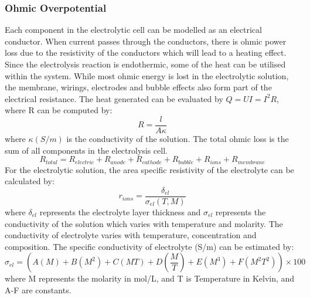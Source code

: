 \subsubsection{Ohmic Overpotential} 
Each component in the electrolytic cell can be modelled as an electrical conductor. When current passes through the conductors, there is ohmic power loss due to the resistivity of the conductors which will lead to a heating effect. Since the electrolysis reaction is endothermic, some of the heat can be utilised within the system. While most ohmic energy is lost in the electrolytic solution, the membrane, wirings, electrodes  and bubble effects also form part of the electrical resistance. The heat generated can be evaluated by  $ Q=UI=I^2 R$, where R can be computed by:
 \begin{equation}
R=\frac{l} {A \kappa} 
\end{equation} 
where $ \kappa(S/m) $  is the conductivity of the solution.\newline
The total ohmic loss is the sum of all components in the electrolysis cell.
\begin{equation} 
R_{total}=R_{electric} + R_{anode}+ R_{cathode}+R_{bubble}+R_{ions} +R_{membrane} 
\end{equation} 
For the electrolytic solution, the area specific resistivity of the electrolyte can be calculated by:\cite{conductivity}
\begin{equation} 
r_{ions}=\frac{\delta_{el}} {\sigma_{el}(T,M) } 
\end{equation} 
where $\delta_{el}$ represents the electrolyte layer thickness and $\sigma_{el}$ represents the conductivity of the solution which varies with temperature and molarity.
The conductivity of electrolyte varies with temperature, concentration and composition. The specific conductivity of electrolyte (S/m) can be estimated by:\cite{conductivity}
\begin{equation} 
\sigma_{el} = (A(M) + B(M^2) + C(MT) + D(\frac{M} {T}) + E(M^3) +F(M^2T^2) )\times 100
\label{eq:sig}
\end{equation} 
where M represents the molarity in mol/L, and T is Temperature in Kelvin, and A-F are constants.
